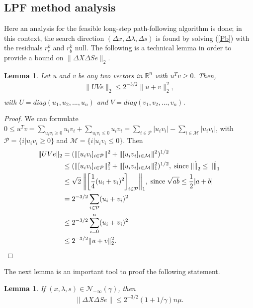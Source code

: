 \documentclass[a4paper,10 pt,titlepage,twoside]{book}
\theoremstyle{plain}
\newtheorem{lem}[thm]{Lemma}
\theoremstyle{definition}
\theoremstyle{remark}
\begin{document}
\subsection{LPF method analysis}
Here an analysis for the feasible long-step path-following algorithm is done; in this context, the search direction $(\Delta x, \Delta \lambda, \Delta s)$ is found by solving (\ref{Pb}) with the residuals $r_{c}^{k}$ and $r_{b}^{k}$ null.
The following is a technical lemma in order to provide a bound on $\lVert\Delta X\Delta S e\rVert_{2}$.
\begin{lem}\label{lem1}
	Let u and v be any two vectors in $\mathbb{R}^{n}$ with $u^{T}v \geq 0$. Then, 
	\begin{align*}
	\lVert UVe \rVert_{2}\leq 2^{-3/2}\lVert u + v \rVert^{2}_{2},\\
	\end{align*}
	with $U = diag(u_{1}, u_{2}, ..., u_{n})$ and $V = diag(v_{1}, v_{2}, ..., v_{n})$. 
\end{lem}
\begin{proof}
	We can formulate $0 \leq u^{T}v = \sum\limits_{u_{i}v_{i} \geq 0}u_{i}v_{i} + \sum\limits_{u_{i}v_{i} \leq 0}u_{i}v_{i} = \sum\limits_{i \in \mathcal{P}}|u_{i}v_{i}| - \sum\limits_{i \in \mathcal{M}}|u_{i}v_{i}| $, with $\mathcal{P}= \{i | u_{i}v_{i} \geq 0\}$ and $\mathcal{M}= \{i | u_{i}v_{i} \leq 0\}$.
	Then
	\begin{align*}
	\lVert UVe \rVert_{2} &= ( \lVert[u_{i}v_{i}]_{i \in \mathcal{P}} \rVert^{2} +  \lVert[u_{i}v_{i}]_{i \in \mathcal{M}} \rVert^{2})^{1/2}\\
	&\leq ( \lVert[u_{i}v_{i}]_{i \in \mathcal{P}} \rVert^{2}_{1} +  \lVert[u_{i}v_{i}]_{i \in \mathcal{M}} \rVert^{2}_{1})^{1/2},\; \text{since\;} \lVert\dot\rVert_{2} \leq \lVert\dot\rVert_{1}\\
	&\leq\sqrt{2}\;\bigg\lVert\bigg[\frac{1}{4}(u_{i} + v_{i})^{2}\bigg]_{i\in \mathcal{P}}\bigg\rVert_{1}, \text{\;since\;} \sqrt{ab} \leq \frac{1}{2}|a+b|\\
	& = 2^{-3/2} \sum\limits_{i \in \mathcal{P}}(u_{i} + v_{i})^{2}\\
	& \leq 2^{-3/2} \sum\limits_{i = 0}^{n}(u_{i} + v_{i})^{2}\\
	& \leq 2^{-3/2} \lVert u + v \rVert^{2}_{2}.
	\end{align*}
\end{proof}	
The next lemma is an important tool to proof the following statement.
\begin{lem}\label{lem:ma1}
	If $(x, \lambda, s) \in \mathcal{N}_{-\infty}(\gamma)$, then
	\begin{align*}
	\lVert\Delta X\Delta S e \rVert \leq 2^{-3/2}(1 + 1/ \gamma)n\mu.\\
	\end{align*}
\end{lem}
\end{document}
